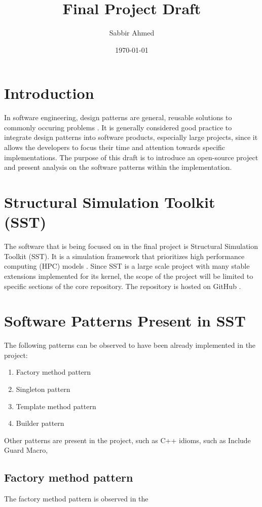 \documentclass[titlepage]{article}
\title{Final Project Draft}
\author{Sabbir Ahmed}
\date{\today}
\begin{document}
\maketitle

\section{Introduction}
In software engineering, design patterns are general, reusable solutions to commonly occuring problems \cite{source-making}. It is generally considered good practice to integrate design patterns into software products, especially large projects, since it allows the developers to focus their time and attention towards specific implementations. The purpose of this draft is to introduce an open-source project and present analysis on the software patterns within the implementation.

\section{Structural Simulation Toolkit (SST)}
The software that is being focused on in the final project is Structural Simulation Toolkit (SST). It is a simulation framework that prioritizes high performance computing (HPC) models \cite{sst}. Since SST is a large scale project with many stable extensions implemented for its kernel, the scope of the project will be limited to specific sections of the core repository. The repository is hosted on GitHub \cite{sst-repo}.

\section{Software Patterns Present in SST}
The following patterns can be observed to have been already implemented in the project:
\begin{enumerate}
    \item Factory method pattern
    \item Singleton pattern
    \item Template method pattern
    \item Builder pattern
\end{enumerate}

Other patterns are present in the project, such as C++ idioms, such as Include Guard Macro,

\subsection{Factory method pattern}
The factory method pattern is observed in the
\end{document}
